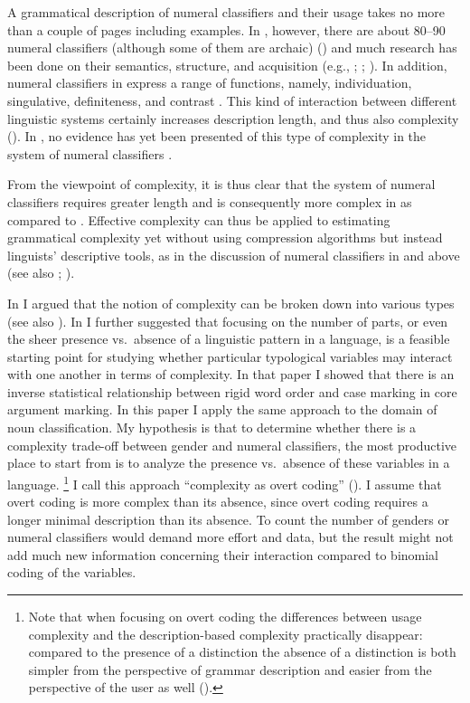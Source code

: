 \documentclass[output=collectionpaper]{langsci/langscibook}
\begin{document}
A grammatical description of  numeral classifiers and their usage takes no more than a couple of pages including examples. In , however, there are about 80--90 numeral classifiers (although some of them are archaic) (\citealt[74]{Iwasaki2005}) and much research has been done on their semantics, structure, and acquisition  (e.g., \citealt{Hundius1983}; \citealt{Gandour1984}; \citealt{Inglis2003}). In addition, numeral classifiers in  express a range of functions, namely, individuation, singulative, definiteness, and contrast \citep{Bisang2009}. This kind of interaction between different linguistic systems certainly increases description length, and thus also complexity (\citealt{Sinnemaeki2014}). In , no evidence has yet been presented of this type of complexity in the system of numeral classifiers \citep[360--368]{Ring2015}.

From the viewpoint of complexity, it is thus clear that the system of numeral classifiers requires greater length \textendash{} and is consequently more complex \textendash{} in  as compared to . Effective complexity can thus be applied to estimating grammatical complexity yet without using compression algorithms but instead linguists' descriptive tools, as in the discussion of numeral classifiers in  and  above (see also \citealt{Miestamo2008}; \citealt{Sinnemaeki2014}).

\largerpage
In \citet{Sinnemaeki2011} I argued that the notion of complexity can be broken down into various types (see also \citealt{Good2012}). In \citet{Sinnemaeki2014} I further suggested that focusing on the number of parts, or even the sheer presence vs.\ absence of a linguistic pattern in a language, is a feasible starting point for studying whether particular typological variables may interact with one another in terms of complexity. In that paper I showed that there is an inverse statistical relationship between rigid word order and case marking in core argument marking. In this paper I apply the same approach to the domain of noun classification. My hypothesis is that to determine whether there is a complexity trade-off between gender and numeral classifiers, the most productive place to start from is to analyze the presence vs.\ absence of these variables in a language.%
\footnote{Note that when focusing on overt coding the differences between usage complexity and the description-based complexity practically disappear: compared to the presence of a distinction the absence of a distinction is both simpler from the perspective of grammar description and easier from the perspective of the user as well (\citealt[127--128]{Sinnemaeki2009}).} %
I call this approach ``complexity as overt coding'' (\citealt{Sinnemaeki2014}). I assume that overt coding is more complex than its absence, since overt coding requires a longer minimal description than its absence. To count the number of genders or numeral classifiers would demand more effort and data, but the result might not add much new information concerning their interaction compared to binomial coding of the variables.
\end{document}
